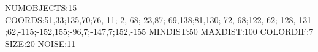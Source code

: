 NUMOBJECTS:15
COORDS:51,33;135,70;76,-11;-2,-68;-23,87;-69,138;81,130;-72,-68;122,-62;-128,-131;62,-115;-152,155;-96,7;-147,7;152,-155
MINDIST:50
MAXDIST:100
COLORDIF:7
SIZE:20
NOISE:11
